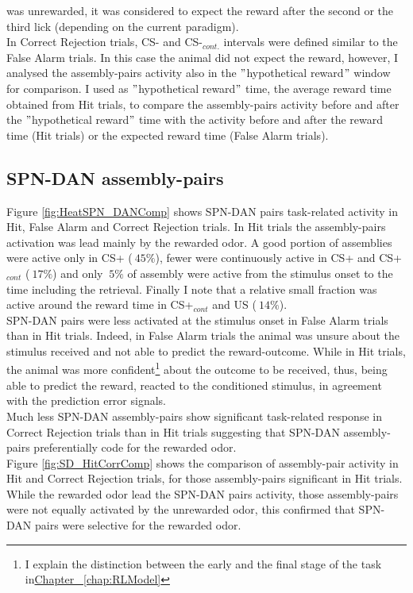 was unrewarded, it was considered to expect the reward after the second or the third lick (depending on the current paradigm).\\In Correct Rejection trials, CS- and CS-$_{cont.}$ intervals were defined similar to the False Alarm trials. In this case the animal did not expect the reward, however, I analysed the assembly-pairs activity also in the $"$hypothetical reward$"$ window for comparison. I used as $"$hypothetical reward$"$ time, the average reward time obtained from Hit trials, to compare the assembly-pairs activity before and after the $"$hypothetical reward$"$ time with the activity before and after the reward time (Hit trials) or the expected reward time (False Alarm trials).
\subsection{SPN-DAN assembly-pairs}
Figure \ref{fig:HeatSPN_DANComp} shows SPN-DAN pairs task-related activity in Hit, False Alarm and Correct Rejection trials. In Hit trials the assembly-pairs activation was lead mainly by the rewarded odor. A good portion of assemblies were active only in CS+ ($~ 45\%$), fewer were continuously active in CS+ and CS+$_{cont}$ ($~17\%$) and only $~5\%$ of assembly were active from the stimulus onset to the time including the retrieval. Finally I note that a relative small fraction was active around the reward time in CS+$_{cont}$ and US ($~ 14\%$).\\SPN-DAN pairs were less activated at the stimulus onset in False Alarm trials than in Hit trials. Indeed, in False Alarm trials the animal was unsure about the stimulus received and not able to predict the reward-outcome. While in Hit trials, the animal was more confident\footnote{I explain the distinction between the early and the final stage of the task in\hyperref[chap:RLModel]{Chapter ~\ref*{chap:RLModel}}} about the outcome to be received, thus, being able to predict the reward, reacted to the conditioned stimulus, in agreement with the prediction error signals.\\
Much less SPN-DAN assembly-pairs show significant task-related response in Correct Rejection trials than in Hit trials suggesting that SPN-DAN assembly-pairs preferentially code for the rewarded odor.\\Figure \ref{fig:SD_HitCorrComp} shows the comparison of assembly-pair activity in Hit and Correct Rejection trials, for those assembly-pairs significant in Hit trials. While the rewarded odor lead the SPN-DAN pairs activity, those assembly-pairs were not equally activated by the unrewarded odor, this confirmed that SPN-DAN pairs were selective for the rewarded odor.
